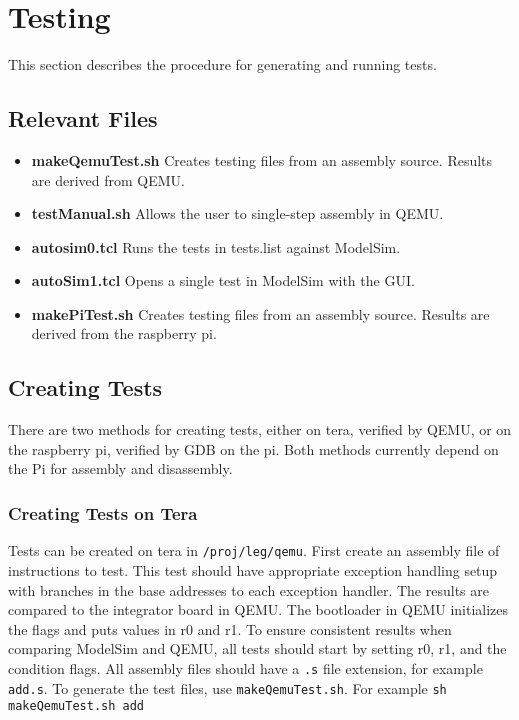 \section{Testing}
This section describes the procedure for generating and running tests. 

\subsection{Relevant Files}
\begin{itemize}
\item \textbf{makeQemuTest.sh} Creates testing files from an assembly source. Results are derived from QEMU. 
\item \textbf{testManual.sh} Allows the user to single-step assembly in QEMU. 
\item \textbf{autosim0.tcl} Runs the tests in tests.list against ModelSim. 
\item \textbf{autoSim1.tcl} Opens a single test in ModelSim with the GUI. 
\item \textbf{makePiTest.sh} Creates testing files from an assembly source. Results are derived from the raspberry pi. 
\end{itemize}

\subsection{Creating Tests}
There are two methods for creating tests, either on tera, verified by QEMU, or on the raspberry pi, verified by GDB on the pi. Both methods currently depend on the Pi for assembly and disassembly. 
\subsubsection{Creating Tests on Tera}
Tests can be created on tera in \texttt{/proj/leg/qemu}. 
First create an assembly file of instructions to test. 
This test should have appropriate exception handling setup with branches in the base addresses to each exception handler. 
The results are compared to the integrator board in QEMU. 
The bootloader in QEMU initializes the flags and puts values in r0 and r1. 
To ensure consistent results when comparing ModelSim and QEMU, all tests should start by setting r0, r1, and the condition flags. 
All assembly files should have a \texttt{.s} file extension, for example \texttt{add.s}. To generate the test files, use \texttt{makeQemuTest.sh}. 
For example \texttt{sh makeQemuTest.sh add}

